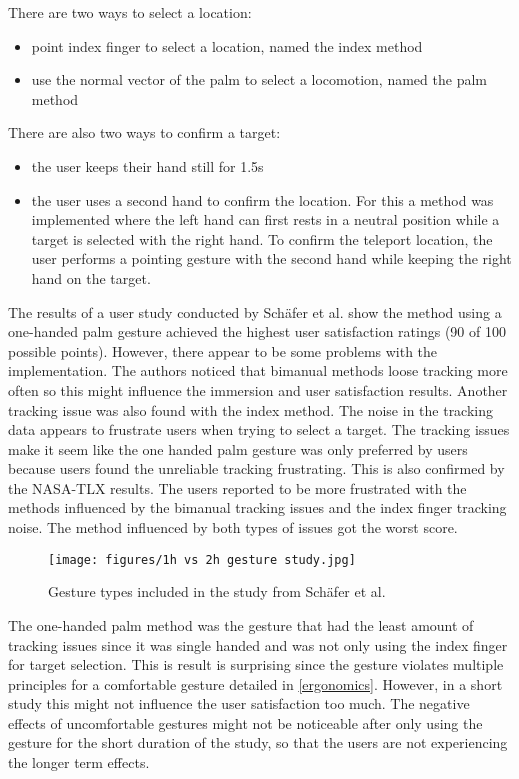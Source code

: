There are two ways to select a location:
\begin{itemize}
  \item point index finger to select a location, named the index method
  \item use the normal vector of the palm to select a locomotion, named the palm method
\end{itemize}

There are also two ways to confirm a target:
\begin{itemize}
  \item the user keeps their hand still for 1.5s
  \item the user uses a second hand to confirm the location. For this a method was implemented where the left hand can first rests in a neutral position while a target is selected with the right hand. To confirm the teleport location, the user performs a pointing gesture with the second hand while keeping the right hand on the target.
\end{itemize}

The results of a user study conducted by Schäfer et al. \cite{Schafer2021} show the method using a one-handed palm gesture achieved the highest user satisfaction ratings (90 of 100 possible points). However, there appear to be some problems with the implementation. The authors noticed that bimanual methods loose tracking more often so this might influence the immersion and user satisfaction results. Another tracking issue was also found with the index method. The noise in the tracking data appears to frustrate users when trying to select a target. The tracking issues make it seem like the one handed palm gesture was only preferred by users because users found the unreliable tracking frustrating. This is also confirmed by the NASA-TLX results. The users reported to be more frustrated with the methods influenced by the bimanual tracking issues and the index finger tracking noise. The method influenced by both types of issues got the worst score. 

\begin{figure}[htb]
  \centering
  \texttt{[image: figures/1h vs 2h gesture study.jpg]}
  \caption{Gesture types included in the study from Schäfer et al. \cite{Schafer2021}}
  \label{fig:1vs2}
\end{figure}

The one-handed palm method was the gesture that had the least amount of tracking issues since it was single handed and was not only using the index finger for target selection. This is result is surprising since the gesture violates multiple principles for a comfortable gesture detailed in \ref{ergonomics}. However, in a short study this might not influence the user satisfaction too much. The negative effects of uncomfortable gestures might not be noticeable after only using the gesture for the short duration of the study, so that the users are not experiencing the longer term effects. 

